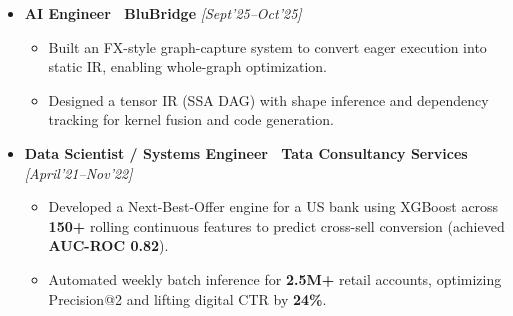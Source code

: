 \documentclass[10pt,article]{article}
\begin{document}
\begin{itemize}
\begin{itemize}
       \item \textbf{Validation \& Guardrails:} Hardened the estimation stage with held-out reconstruction benchmarks across realistic missing-data patterns, per-request confidence scoring, and basis-versioning with drift-triggered refits, preventing silently-wrong estimates from reaching downstream optimization.
       \item \textbf{Energy-System Sizing Optimization:} Replaced a legacy Differential Evolution + L-BFGS-B model ($>$10\,s solve) with Bayesian Optimization + L-BFGS-B, cutting solve time to \textbf{2--3\,s} for live in-browser trial runs with instant ROI previews ($\sim$20\% savings); architected a dual-solver pattern pairing the fast in-session heuristic with a parallel LP model for the near-global optimum.
       \item \textbf{Drift Monitoring \& Infrastructure:} Engineered an event-driven, asynchronous drift-monitoring pipeline (async I/O + concurrent workers) running distribution-shift checks across demand, solar/wind, and tariff/PPA inputs plus optimization outputs without blocking the core workload; containerized all frameworks with Docker and automated deployments on AWS via CI/CD.
   \end{itemize}
   \item \textbf{AI Engineer \textbar\ BluBridge} \hfill \textit{[Sept'25--Oct'25]}
   \begin{itemize}
       \item Built an FX-style graph-capture system to convert eager execution into static IR, enabling whole-graph optimization.
       \item Designed a tensor IR (SSA DAG) with shape inference and dependency tracking for kernel fusion and code generation.
   \end{itemize}
   \item \textbf{Data Scientist / Systems Engineer \textbar\ Tata Consultancy Services} \hfill \textit{[April'21--Nov'22]}
   \begin{itemize}
       \item Developed a Next-Best-Offer engine for a US bank using XGBoost across \textbf{150+} rolling continuous features to predict cross-sell conversion (achieved \textbf{AUC-ROC 0.82}).
       \item Automated weekly batch inference for \textbf{2.5M+} retail accounts, optimizing Precision@2 and lifting digital CTR by \textbf{24\%}.
   \end{itemize}
\end{itemize}
\end{document}

